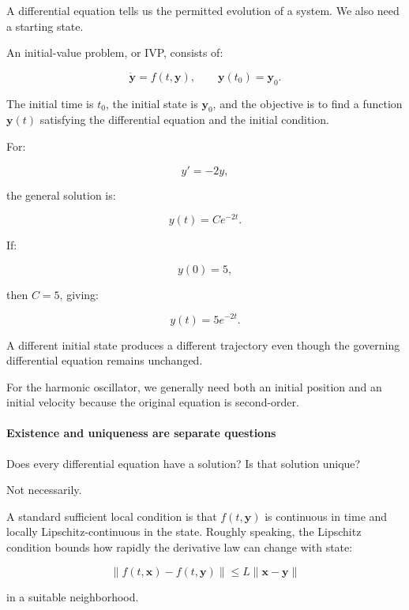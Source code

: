 \hypertarget{02-foundations-ii-ch022-initial-value-problems-why-a-law-does-not-determine-a-unique-history}{}

A differential equation tells us the permitted evolution of a system. We also need a starting state.

An initial-value problem, or IVP, consists of:

\[
\boxed{ \dot{\mathbf y}=f(t,\mathbf y), \qquad \mathbf y(t_0)=\mathbf y_0 }.
\]

The initial time is \(t_0\), the initial state is \(\mathbf y_0\), and the objective is to find a function \(\mathbf y(t)\) satisfying the differential equation and the initial condition.

For:

\[
y'=-2y,
\]

the general solution is:

\[
y(t)=Ce^{-2t}.
\]

If:

\[
y(0)=5,
\]

then \(C=5\), giving:

\[
\boxed{y(t)=5e^{-2t}}.
\]

A different initial state produces a different trajectory even though the governing differential equation remains unchanged.

For the harmonic oscillator, we generally need both an initial position and an initial velocity because the original equation is second-order.

\paragraph{Existence and uniqueness are separate questions}\label{02-foundations-ii-ch022-existence-and-uniqueness-are-separate-questions}

\hypertarget{02-foundations-ii-ch022-existence-and-uniqueness-are-separate-questions}{}

Does every differential equation have a solution? Is that solution unique?

Not necessarily.

A standard sufficient local condition is that \(f(t,\mathbf y)\) is continuous in time and locally Lipschitz-continuous in the state. Roughly speaking, the Lipschitz condition bounds how rapidly the derivative law can change with state:

\[
\|f(t,\mathbf x)-f(t,\mathbf y)\| \le L\|\mathbf x-\mathbf y\|
\]

in a suitable neighborhood.

